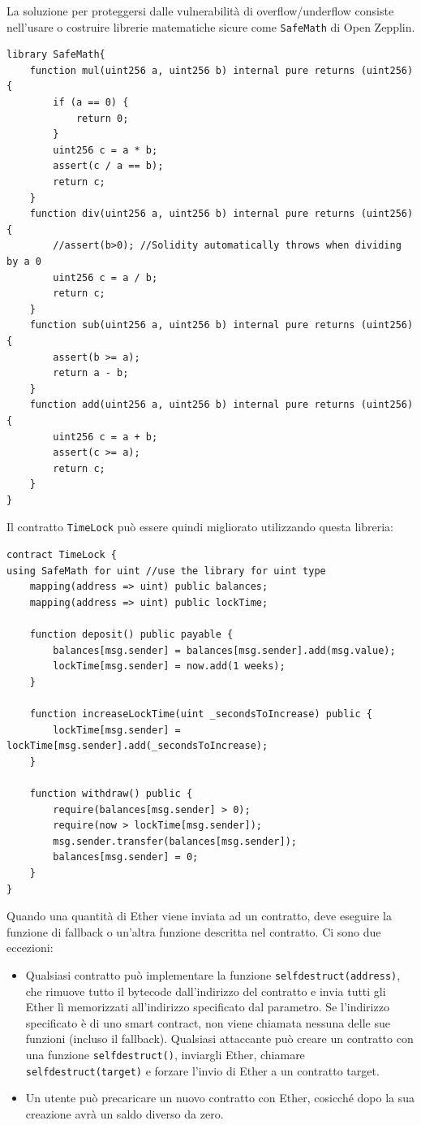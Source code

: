 La soluzione per proteggersi dalle vulnerabilità di overflow/underflow consiste nell'usare o costruire librerie matematiche sicure come \texttt{SafeMath} di Open Zepplin.
\begin{lstlisting}[language=Solidity]
library SafeMath{
    function mul(uint256 a, uint256 b) internal pure returns (uint256) {
        if (a == 0) {
            return 0;
        }
        uint256 c = a * b;
        assert(c / a == b);
        return c;
    }
    function div(uint256 a, uint256 b) internal pure returns (uint256) {
        //assert(b>0); //Solidity automatically throws when dividing by a 0
        uint256 c = a / b;
        return c;
    }
    function sub(uint256 a, uint256 b) internal pure returns (uint256) {
        assert(b >= a);
        return a - b;
    }
    function add(uint256 a, uint256 b) internal pure returns (uint256) {
        uint256 c = a + b;
        assert(c >= a);
        return c;
    }
}
\end{lstlisting}
Il contratto \texttt{TimeLock} può essere quindi migliorato utilizzando questa libreria:
\begin{lstlisting}[language=Solidity]
contract TimeLock {
using SafeMath for uint //use the library for uint type
    mapping(address => uint) public balances;
    mapping(address => uint) public lockTime;
    
    function deposit() public payable {
        balances[msg.sender] = balances[msg.sender].add(msg.value);
        lockTime[msg.sender] = now.add(1 weeks);
    }
    
    function increaseLockTime(uint _secondsToIncrease) public {
        lockTime[msg.sender] = lockTime[msg.sender].add(_secondsToIncrease);
    }
    
    function withdraw() public {
        require(balances[msg.sender] > 0);
        require(now > lockTime[msg.sender]);
        msg.sender.transfer(balances[msg.sender]);
        balances[msg.sender] = 0;
    }
}
\end{lstlisting}
Quando una quantità di Ether viene inviata ad un contratto, deve eseguire la funzione di fallback o un'altra funzione descritta nel contratto. Ci sono due eccezioni:
\begin{itemize}
    \item Qualsiasi contratto può implementare la funzione \texttt{selfdestruct(address)}, che rimuove tutto il bytecode dall'indirizzo del contratto e invia tutti gli Ether lì memorizzati all'indirizzo specificato dal parametro. Se l'indirizzo specificato è di uno smart contract, non viene chiamata nessuna delle sue funzioni (incluso il fallback). Qualsiasi attaccante può creare un contratto con una funzione \texttt{selfdestruct()}, inviargli Ether, chiamare \texttt{selfdestruct(target)} e forzare l'invio di Ether a un contratto target.
    \item Un utente può precaricare un nuovo contratto con Ether, cosicché dopo la sua creazione avrà un saldo diverso da zero.
\end{itemize}

